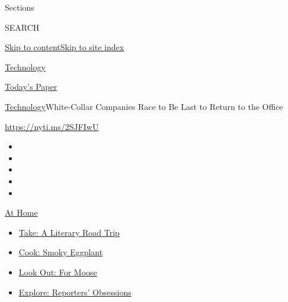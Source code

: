 Sections

SEARCH

\protect\hyperlink{site-content}{Skip to
content}\protect\hyperlink{site-index}{Skip to site index}

\href{https://www.nytimes3xbfgragh.onion/section/technology}{Technology}

\href{https://myaccount.nytimes3xbfgragh.onion/auth/login?response_type=cookie\&client_id=vi}{}

\href{https://www.nytimes3xbfgragh.onion/section/todayspaper}{Today's
Paper}

\href{/section/technology}{Technology}\textbar{}White-Collar Companies
Race to Be Last to Return to the Office

\url{https://nyti.ms/2SJFIwU}

\begin{itemize}
\item
\item
\item
\item
\item
\end{itemize}

\href{https://www.nytimes3xbfgragh.onion/spotlight/at-home?action=click\&pgtype=Article\&state=default\&region=TOP_BANNER\&context=at_home_menu}{At
Home}

\begin{itemize}
\tightlist
\item
  \href{https://www.nytimes3xbfgragh.onion/2020/07/28/books/time-for-a-literary-road-trip.html?action=click\&pgtype=Article\&state=default\&region=TOP_BANNER\&context=at_home_menu}{Take:
  A Literary Road Trip}
\item
  \href{https://www.nytimes3xbfgragh.onion/2020/07/29/magazine/bored-with-your-home-cooking-some-smoky-eggplant-will-fix-that.html?action=click\&pgtype=Article\&state=default\&region=TOP_BANNER\&context=at_home_menu}{Cook:
  Smoky Eggplant}
\item
  \href{https://www.nytimes3xbfgragh.onion/2020/07/27/travel/moose-michigan-isle-royale.html?action=click\&pgtype=Article\&state=default\&region=TOP_BANNER\&context=at_home_menu}{Look
  Out: For Moose}
\item
  \href{https://www.nytimes3xbfgragh.onion/interactive/2020/at-home/even-more-reporters-editors-diaries-lists-recommendations.html?action=click\&pgtype=Article\&state=default\&region=TOP_BANNER\&context=at_home_menu}{Explore:
  Reporters' Obsessions}
\end{itemize}


